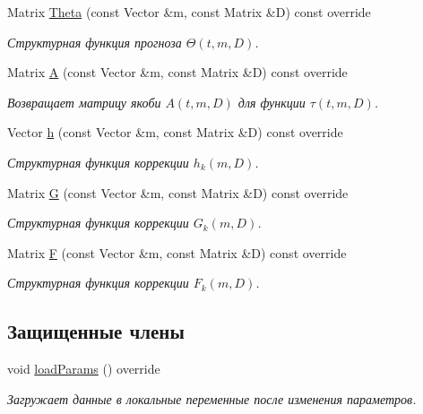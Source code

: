 \begin{DoxyCompactItemize}
Matrix \hyperlink{class_tasks_1_1_continuous_discrete_1_1_van_der_pol_linear_a6d2f1c4c12551eda7eb97322335960ef}{Theta} (const Vector \&m, const Matrix \&D) const override
\begin{DoxyCompactList}\small\item\em Структурная функция прогноза $\Theta(t,m,D)$. \end{DoxyCompactList}\item 
Matrix \hyperlink{class_tasks_1_1_continuous_discrete_1_1_van_der_pol_linear_abc0ead5ddd90702a5bbb93b07c74df85}{A} (const Vector \&m, const Matrix \&D) const override
\begin{DoxyCompactList}\small\item\em Возвращает матрицу якоби $A(t, m, D)$ для функции $\tau(t, m, D)$. \end{DoxyCompactList}\item 
Vector \hyperlink{class_tasks_1_1_continuous_discrete_1_1_van_der_pol_linear_a2a3ca4ebc2e8c458fbea40e854f375ec}{h} (const Vector \&m, const Matrix \&D) const override
\begin{DoxyCompactList}\small\item\em Структурная функция коррекции $h_k(m, D)$. \end{DoxyCompactList}\item 
Matrix \hyperlink{class_tasks_1_1_continuous_discrete_1_1_van_der_pol_linear_aad1f3c80a043157b90ba0b55ba2390b1}{G} (const Vector \&m, const Matrix \&D) const override
\begin{DoxyCompactList}\small\item\em Структурная функция коррекции $G_k(m, D)$. \end{DoxyCompactList}\item 
Matrix \hyperlink{class_tasks_1_1_continuous_discrete_1_1_van_der_pol_linear_ac624f91abb5e440d9b05835ca281f53f}{F} (const Vector \&m, const Matrix \&D) const override
\begin{DoxyCompactList}\small\item\em Структурная функция коррекции $F_k(m, D)$. \end{DoxyCompactList}\end{DoxyCompactItemize}
\subsection*{Защищенные члены}
\begin{DoxyCompactItemize}
\item 
\hypertarget{class_tasks_1_1_continuous_discrete_1_1_van_der_pol_linear_ab69c35a56affe59f0f7401e6c3675d14}{}\label{class_tasks_1_1_continuous_discrete_1_1_van_der_pol_linear_ab69c35a56affe59f0f7401e6c3675d14} 
void \hyperlink{class_tasks_1_1_continuous_discrete_1_1_van_der_pol_linear_ab69c35a56affe59f0f7401e6c3675d14}{load\+Params} () override
\begin{DoxyCompactList}\small\item\em Загружает данные в локальные переменные после изменения параметров. \end{DoxyCompactList}\end{DoxyCompactItemize}
